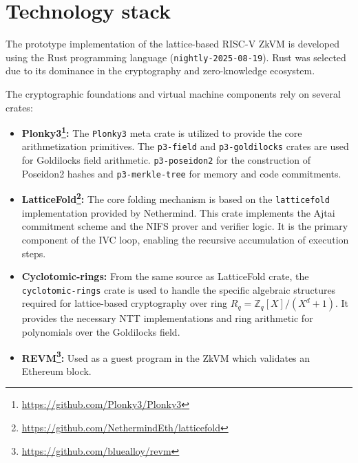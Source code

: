 \section{Technology stack}\label{sec:tech_stack}

The prototype implementation of the lattice-based RISC-V ZkVM is developed
using the Rust programming language (\texttt{nightly-2025-08-19}). Rust was
selected due to its dominance in the cryptography and zero-knowledge ecosystem.

The cryptographic foundations and virtual machine components rely on several
crates:

\begin{itemize}
	\item \textbf{Plonky3\footnote{\url{https://github.com/Plonky3/Plonky3}}:} The \texttt{Plonky3} meta crate is utilized to
	      provide the core arithmetization primitives. The \texttt{p3-field} and
	      \texttt{p3-goldilocks} crates are used for Goldilocks field
	      arithmetic. \texttt{p3-poseidon2} for the construction of Poseidon2
	      hashes and \texttt{p3-merkle-tree} for memory and code commitments.

	\item \textbf{LatticeFold\footnote{\url{https://github.com/NethermindEth/latticefold}}:} The core folding mechanism is based on the
	      \texttt{latticefold} implementation provided by Nethermind. This
	      crate implements the Ajtai commitment scheme and the NIFS prover and
	      verifier logic. It is the primary component of the IVC loop,
	      enabling the recursive accumulation of execution steps.

	\item \textbf{Cyclotomic-rings\footnotemark[\value{footnote}]:} From the same source as LatticeFold crate,
	      the \texttt{cyclotomic-rings} crate is used to handle the specific
	      algebraic structures required for lattice-based cryptography over ring
	      $R_q = \mathbb{Z}_q[X]/(X^d+1)$. It provides the necessary NTT
	      implementations and ring arithmetic for polynomials over the
	      Goldilocks field.

	\item \textbf{REVM\footnote{\url{https://github.com/bluealloy/revm}}:} Used as a guest program in the ZkVM which validates an Ethereum block.
\end{itemize}
